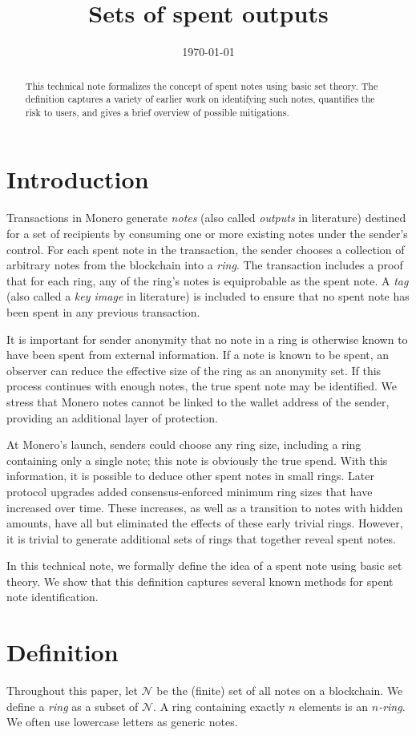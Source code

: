 \documentclass{mrl}
\title{Sets of spent outputs}
\date{\today}
\begin{document}
\begin{abstract}
This technical note formalizes the concept of spent notes using basic set theory. The definition captures a variety of earlier work on identifying such notes, quantifies the risk to users, and gives a brief overview of possible mitigations.
\end{abstract}

\section{Introduction}
Transactions in Monero generate \textit{notes} (also called \textit{outputs} in literature) destined for a set of recipients by consuming one or more existing notes under the sender's control. For each spent note in the transaction, the sender chooses a collection of arbitrary notes from the blockchain into a \textit{ring}. The transaction includes a proof that for each ring, any of the ring's notes is equiprobable as the spent note. A \textit{tag} (also called a \textit{key image} in literature) is included to ensure that no spent note has been spent in any previous transaction.

It is important for sender anonymity that no note in a ring is otherwise known to have been spent from external information. If a note is known to be spent, an observer can reduce the effective size of the ring as an anonymity set. If this process continues with enough notes, the true spent note may be identified. We stress that Monero notes cannot be linked to the wallet address of the sender, providing an additional layer of protection.

At Monero's launch, senders could choose any ring size, including a ring containing only a single note; this note is obviously the true spend. With this information, it is possible to deduce other spent notes in small rings. Later protocol upgrades added consensus-enforced minimum ring sizes that have increased over time. These increases, as well as a transition to notes with hidden amounts, have all but eliminated the effects of these early trivial rings. However, it is trivial to generate additional sets of rings that together reveal spent notes.

In this technical note, we formally define the idea of a spent note using basic set theory. We show that this definition captures several known methods for spent note identification.

\section{Definition}
Throughout this paper, let $\mathcal{N}$ be the (finite) set of all notes on a blockchain. We define a \textit{ring} as a subset of $\mathcal{N}$. A ring containing exactly $n$ elements is an $n$\textit{-ring}. We often use lowercase letters as generic notes.
\end{document}
